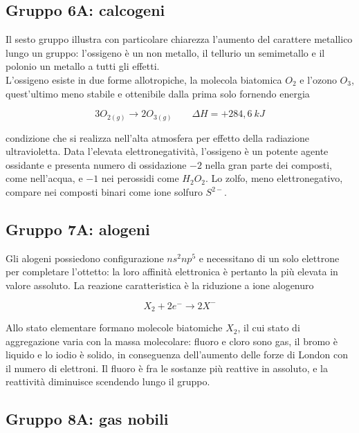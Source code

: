 \subsection{Gruppo 6A: calcogeni}

Il sesto gruppo illustra con particolare chiarezza l'aumento del carattere metallico lungo un gruppo: l'ossigeno è un non metallo, il tellurio un semimetallo e il polonio un metallo a tutti gli effetti.\\

L'ossigeno esiste in due forme allotropiche, la molecola biatomica $O_2$ e l'ozono $O_3$, quest'ultimo meno stabile e ottenibile dalla prima solo fornendo energia

\begin{equation}
    3O_{2(g)} \longrightarrow 2O_{3(g)} \qquad \Delta H = + 284,6 \ kJ
    \label{eq:ozono}
\end{equation}

condizione che si realizza nell'alta atmosfera per effetto della radiazione ultravioletta. Data l'elevata elettronegatività, l'ossigeno è un potente agente ossidante e presenta numero di ossidazione $-2$ nella gran parte dei composti, come nell'acqua, e $-1$ nei perossidi come $H_2O_2$. Lo zolfo, meno elettronegativo, compare nei composti binari come ione solfuro $S^{2-}$.

\subsection{Gruppo 7A: alogeni}

Gli alogeni possiedono configurazione $ns^2np^5$ e necessitano di un solo elettrone per completare l'ottetto: la loro affinità elettronica è pertanto la più elevata in valore assoluto. La reazione caratteristica è la riduzione a ione alogenuro

\begin{equation}
    X_2 + 2e^- \longrightarrow 2X^-
    \label{eq:alogenuro}
\end{equation}

Allo stato elementare formano molecole biatomiche $X_2$, il cui stato di aggregazione varia con la massa molecolare: fluoro e cloro sono gas, il bromo è liquido e lo iodio è solido, in conseguenza dell'aumento delle forze di London con il numero di elettroni. 
Il fluoro è fra le sostanze più reattive in assoluto, e la reattività diminuisce scendendo lungo il gruppo.

\subsection{Gruppo 8A: gas nobili}

